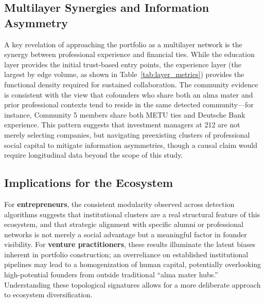 \documentclass[conference]{IEEEtran}
\begin{document}
\subsection{Multilayer Synergies and Information Asymmetry}
A key revelation of approaching the portfolio as a multilayer network is the synergy between professional experience and financial ties. While the education layer provides the initial trust-based entry points, the experience layer (the largest by edge volume, as shown in Table~\ref{tab:layer_metrics}) provides the functional density required for sustained collaboration. The community evidence is consistent with the view that cofounders who share both an alma mater and prior professional contexts tend to reside in the same detected community—for instance, Community 5 members share both METU ties and Deutsche Bank experience. This pattern suggests that investment managers at 212 are not merely selecting companies, but navigating preexisting clusters of professional social capital to mitigate information asymmetries, though a causal claim would require longitudinal data beyond the scope of this study.

\subsection{Implications for the Ecosystem}
For \textbf{entrepreneurs}, the consistent modularity observed across detection algorithms suggests that institutional clusters are a real structural feature of this ecosystem, and that strategic alignment with specific alumni or professional networks is not merely a social advantage but a meaningful factor in founder visibility. For \textbf{venture practitioners}, these results illuminate the latent biases inherent in portfolio construction; an overreliance on established institutional pipelines may lead to a homogenization of human capital, potentially overlooking high-potential founders from outside traditional ``alma mater hubs.'' Understanding these topological signatures allows for a more deliberate approach to ecosystem diversification.
\end{document}
